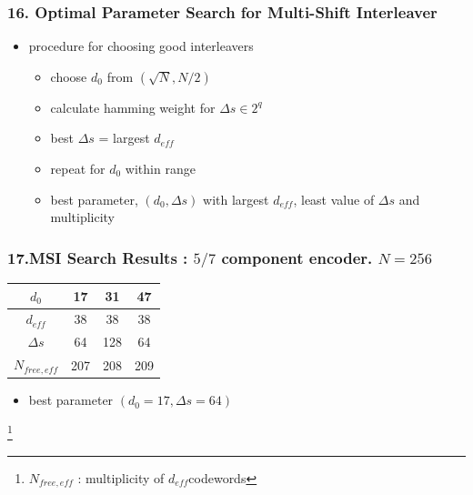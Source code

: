 \documentclass{beamer}  %
\newcommand\blfootnote[1]{%
  \begingroup
  \renewcommand\thefootnote{}\footnote{#1}%
  \addtocounter{footnote}{-1}%
  \endgroup
}
\begin{document}
\begin{frame}
\frametitle{16. Optimal Parameter Search for Multi-Shift Interleaver}

\begin{itemize}
\setlength\itemsep{2em}

\item procedure for choosing good interleavers

\begin{itemize}
\setlength\itemsep{1em}
\item choose $d_0$ from $(\sqrt{N},N/2)$

\item calculate hamming weight for  $\Delta s \in 2^q$



\item best $\Delta s$ = largest $d_{eff}$



\item repeat for $d_0$ within range 

\item best parameter, $(d_0, \Delta s)$ with largest $d_{eff}$, least value of $\Delta s$ and multiplicity
\end{itemize}



\end{itemize}

\end{frame}

\begin{frame}
\frametitle{17.MSI Search Results : $5/7$ component encoder. $N=256$}
\begin{table}[h!]
\centering
\begin{tabular}{||c |c |c |c||} 
 \hline
 $d_0$ & 17 & 31 & 47 \\ [0.5ex] 
 \hline\hline
  $d_{eff}$ & 38 & 38 & 38 \\ 
 \hline
 $\Delta s$ & 64 & 128 & 64 \\ 
  \hline
  $N_{free, eff}$ & 207 & 208 & 209 \\ [1ex] 
 \hline
\end{tabular}
\label{tab1}
\end{table}

\begin{itemize}
\item best parameter $(d_0=17,\Delta s = 64)$
\end{itemize}
\blfootnote{ $N_{free, eff}$ : multiplicity of $d_{eff} $codewords}
\end{frame}
\end{document}
